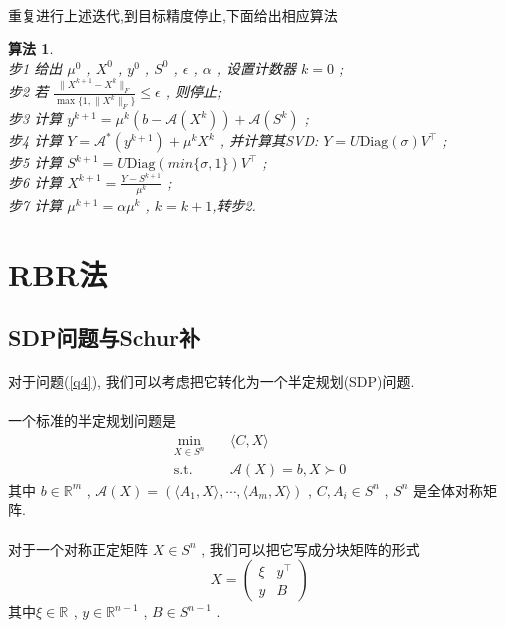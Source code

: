 \documentclass[UTF8]{ctexart}
\newtheorem{algo}{\bf 算法}
\newcommand{\equSplit}[1]{\begin{equation}\begin{split}#1\end{split}\end{equation}}
\newcommand{\equ}[1]{\begin{equation}#1\end{equation}}
\newcommand{\Tst}{\text{s.t.}\quad}
\newcommand{\norm}[1]{\lVert#1\rVert}
\newcommand{\inprod}[1]{\langle#1\rangle}
\newcommand{\Real}[1]{\mathbb{R}^{#1}}
\newcommand{\Ma}{\mathcal{A}}
\newcommand{\pMa}[1]{\begin{pmatrix}#1\end{pmatrix}}
\numberwithin{equation}{section}
\begin{document}
			\paragraph{}
				\quad 重复进行上述迭代,到目标精度停止,下面给出相应算法
				\begin{algo}
					\quad\\
					步1 \quad 给出 $\mu^0$ , $X^0$ , $y^0$ , $S^0$ , $\epsilon$ , $\alpha$ , 设置计数器 $k=0$ ;\\
					步2 \quad 若 $\frac{\norm{X^{k + 1} - X^k}_F}{\max \{1, \norm{X^k}_F\}} \leq \epsilon$ , 则停止;\\
					步3 \quad 计算 $y^{k + 1} = \mu^k (b - \Ma(X^k)) + \Ma(S^k)$ ;\\
					步4 \quad 计算 $Y = \Ma^*(y^{k + 1}) + \mu^k X^k$ , 并计算其SVD: $Y = U \text{Diag}(\sigma) V^\top$ ;\\
					步5 \quad 计算 $S^{k + 1} = U \text{Diag}(min \{\sigma, 1\}) V^\top$ ;\\
					步6 \quad 计算 $X^{k + 1} = \frac{Y - S^{k + 1}}{\mu^k}$ ;\\
					步7 \quad 计算 $\mu^{k + 1} = \alpha \mu^k$ , $k = k + 1$,转步2.
				\end{algo}

	\section{RBR法}
		\subsection{SDP问题与Schur补}
			\paragraph{}
				\quad 对于问题(\ref{q4}), 我们可以考虑把它转化为一个半定规划(SDP)问题.

			\paragraph{}
				\quad 一个标准的半定规划问题是
				\equSplit{\label{SDP}
					\min_{X \in S^n} \quad	& \inprod{C, X}\\
					\Tst					& \Ma(X) = b, X \succ 0}
				其中 $b \in \Real{m}$ , $\Ma(X) = (\inprod{A_1, X}, \cdots, \inprod{A_m, X})$ , $C, A_i \in S^n$ , $S^n$ 是全体对称矩阵.

			\paragraph{}
				\quad 对于一个对称正定矩阵 $X \in S^n$ , 我们可以把它写成分块矩阵的形式
				\equ{
					X = \pMa{\xi & y^\top \\ y & B}
				}
				其中$\xi \in \Real{}$ , $y \in \Real{n-1}$ , $B \in S^{n - 1}$ .
\end{document}
